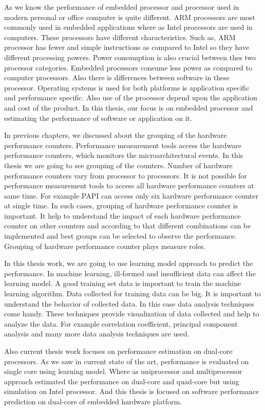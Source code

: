 \par As we know the performance of embedded processor and processor used in modern personal or office computer is quite different. ARM processors are most commonly used in embedded applications where as Intel processors are used in computers. These processors have different characteristics. Such as, ARM processor has fewer and simple instructions as compared to Intel so they have different processing powers. Power consumption is also crucial between thes two processor categories. Embedded processors consume less power as compared to computer processors. Also there is differences between software in these processor. Operating systems is used for both platforms is application specific and performance specific. Also use of the processor depend upon the application and cost of the product. In this thesis, our focus is on embedded processor and estimating the performance of software or application on it.

\par In previous chapters, we discussed about the grouping of the hardware performance counters. Performance measurement tools access the hardware performance counters, which monitors the microarchitectural events. In this thesis we are going to see grouping of the counters. Number of hardware performance counters vary from processor to processors. It is not possible for performance measurement tools to access all hardware performance counters at same time. For example PAPI can access only six hardware performance counter at single time. In such cases, grouping of hardware performance counter is important. It help to understand the impact of each hardware performance counter on other counters and according to that different combinations can be implemented and best groups can be selected to observe the performance. Grouping of hardware performance counter plays measure roles. 

\par In this thesis work, we are going to use learning model approach to predict the performance. In machine learning, ill-formed and insufficient data can affect the learning model. A good training set data is important to train the machine learning algorithm. Data collected for training data can be big. It is important to understand the behavior of collected data. In this case data analysis techniques come handy. These techniques provide visualization of data collected and help to analyze the data. For example correlation coefficient, principal component analysis and many more data analysis techniques are used. 

\par Also current thesis work focuses on performance estimation on dual-core processors. As we saw in current state of the art, performance is evaluated on single core using learning model. Where as uniprocessor and multiprocessor approach estimated the performance on dual-core and quad-core but using simulation on Intel processor. And this thesis is focused on software performance prediction on dual-core of embedded hardware platform.